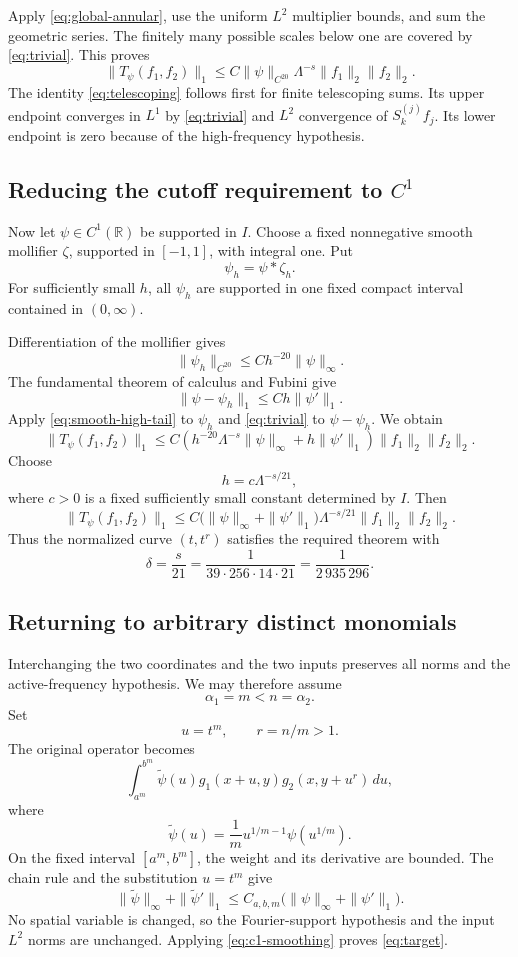\documentclass[11pt,a4paper]{article}
\newcommand{\R}{\mathbb R}
\begin{document}
Apply \eqref{eq:global-annular}, use the uniform $L^2$ multiplier bounds,
and sum the geometric series. The finitely many possible scales below
one are covered by \eqref{eq:trivial}. This proves
\[
\|T_\psi(f_1,f_2)\|_1
\leq C\|\psi\|_{C^{20}}\Lambda^{-s}\|f_1\|_2\|f_2\|_2.
\tag{8.2}\label{eq:smooth-high-tail}
\]
The identity \eqref{eq:telescoping} follows first for finite telescoping
sums. Its upper endpoint converges in $L^1$ by \eqref{eq:trivial} and
$L^2$ convergence of $S_k^{(j)}f_j$. Its lower endpoint is zero because
of the high-frequency hypothesis.

\subsection{Reducing the cutoff requirement to \texorpdfstring{$C^1$}{C1}}

Now let $\psi\in C^1(\R)$ be supported in $I$. Choose a fixed nonnegative
smooth mollifier $\zeta$, supported in $[-1,1]$, with integral one. Put
\[
\psi_h=\psi*\zeta_h.
\]
For sufficiently small $h$, all $\psi_h$ are supported in one fixed
compact interval contained in $(0,\infty)$.

Differentiation of the mollifier gives
\[
\|\psi_h\|_{C^{20}}\leq Ch^{-20}\|\psi\|_\infty.
\tag{8.3}\label{eq:mollified-cutoff}
\]
The fundamental theorem of calculus and Fubini give
\[
\|\psi-\psi_h\|_1\leq Ch\|\psi'\|_1.
\tag{8.4}\label{eq:mollification-error}
\]
Apply \eqref{eq:smooth-high-tail} to $\psi_h$ and \eqref{eq:trivial} to
$\psi-\psi_h$. We obtain
\[
\|T_\psi(f_1,f_2)\|_1
\leq C\left(h^{-20}\Lambda^{-s}\|\psi\|_\infty
+h\|\psi'\|_1\right)\|f_1\|_2\|f_2\|_2.
\]
Choose
\[
h=c\Lambda^{-s/21},
\]
where $c>0$ is a fixed sufficiently small constant determined by $I$.
Then
\[
\|T_\psi(f_1,f_2)\|_1
\leq C\bigl(\|\psi\|_\infty+\|\psi'\|_1\bigr)
\Lambda^{-s/21}\|f_1\|_2\|f_2\|_2.
\tag{8.5}\label{eq:c1-smoothing}
\]
Thus the normalized curve $(t,t^r)$ satisfies the required theorem with
\[
\delta=\frac{s}{21}
=\frac{1}{39\cdot256\cdot14\cdot21}
=\frac{1}{2\,935\,296}.
\tag{8.6}\label{eq:final-exponent}
\]

\subsection{Returning to arbitrary distinct monomials}

Interchanging the two coordinates and the two inputs preserves all norms
and the active-frequency hypothesis. We may therefore assume
\[
\alpha_1=m<n=\alpha_2.
\]
Set
\[
u=t^m,\qquad r=n/m>1.
\]
The original operator becomes
\[
\int_{a^m}^{b^m}\widetilde\psi(u)
 g_1(x+u,y)g_2(x,y+u^r)\,du,
\]
where
\[
\widetilde\psi(u)=\frac1m u^{1/m-1}\psi(u^{1/m}).
\tag{8.7}\label{eq:changed-cutoff}
\]
On the fixed interval $[a^m,b^m]$, the weight and its derivative are
bounded. The chain rule and the substitution $u=t^m$ give
\[
\|\widetilde\psi\|_\infty+\|\widetilde\psi'\|_1
\leq C_{a,b,m}\bigl(\|\psi\|_\infty+\|\psi'\|_1\bigr).
\tag{8.8}\label{eq:changed-cutoff-bound}
\]
No spatial variable is changed, so the Fourier-support hypothesis and the
input $L^2$ norms are unchanged. Applying \eqref{eq:c1-smoothing} proves
\eqref{eq:target}.
\end{document}
